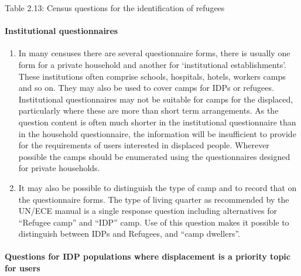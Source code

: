 \documentclass[
]{article}
\begin{document}
Table 2.13: Census questions for the identification of refugees

\hypertarget{institutional-questionnaires}{%
\paragraph{Institutional questionnaires}\label{institutional-questionnaires}}

\begin{enumerate}
\def\labelenumi{\arabic{enumi}.}
\setcounter{enumi}{91}
\item
  In many censuses there are several questionnaire forms, there is
  usually one form for a private household and another for
  `institutional establishments'. These institutions often comprise
  schools, hospitals, hotels, workers camps and so on. They may also
  be used to cover camps for IDPs or refugees. Institutional
  questionnaires may not be suitable for camps for the displaced,
  particularly where these are more than short term arrangements. As
  the question content is often much shorter in the institutional
  questionnaire than in the household questionnaire, the information
  will be insufficient to provide for the requirements of users
  interested in displaced people. Wherever possible the camps should
  be enumerated using the questionnaires designed for private
  households.
\item
  It may also be possible to distinguish the type of camp and to
  record that on the questionnaire forms. The type of living quarter
  as recommended by the UN/ECE manual is a single response question
  including alternatives for ``Refugee camp'' and ``IDP'' camp. Use of
  this question makes it possible to distinguish between IDPs and
  Refugees, and ``camp dwellers''.
\end{enumerate}

\hypertarget{questions-for-idp-populations-where-displacement-is-a-priority-topic-for-users}{%
\paragraph{Questions for IDP populations where displacement is a priority topic for users}\label{questions-for-idp-populations-where-displacement-is-a-priority-topic-for-users}}
\end{document}

